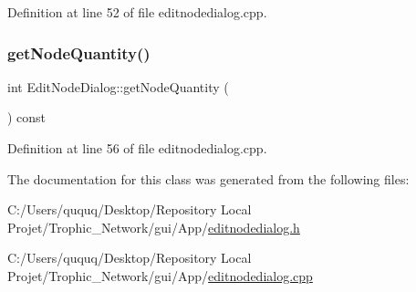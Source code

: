 Definition at line 52 of file editnodedialog.\+cpp.

\mbox{\label{class_edit_node_dialog_aacda0fe9314fb3165cd56394371a1ee4}} 
\subsubsection{\texorpdfstring{get\+Node\+Quantity()}{getNodeQuantity()}}
{\footnotesize\ttfamily int Edit\+Node\+Dialog\+::get\+Node\+Quantity (\begin{DoxyParamCaption}{ }\end{DoxyParamCaption}) const}



Definition at line 56 of file editnodedialog.\+cpp.



The documentation for this class was generated from the following files\+:\begin{DoxyCompactItemize}
\item 
C\+:/\+Users/ququq/\+Desktop/\+Repository Local Projet/\+Trophic\+\_\+\+Network/gui/\+App/\mbox{\hyperlink{editnodedialog_8h}{editnodedialog.\+h}}\item 
C\+:/\+Users/ququq/\+Desktop/\+Repository Local Projet/\+Trophic\+\_\+\+Network/gui/\+App/\mbox{\hyperlink{editnodedialog_8cpp}{editnodedialog.\+cpp}}\end{DoxyCompactItemize}
